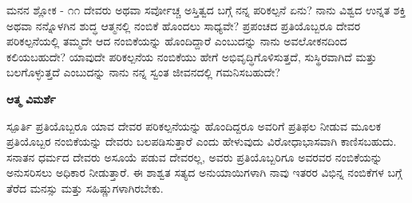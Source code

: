 \begin{mananam}{\mananamfont ಮನನ ಶ್ಲೋಕ - ೧೧}
\mananamtext ದೇವರು ಅಥವಾ ಸರ್ವೋಚ್ಚ ಅಸ್ತಿತ್ವದ ಬಗ್ಗೆ ನನ್ನ ಪರಿಕಲ್ಪನೆ ಏನು? ನಾನು ವಿಶ್ವದ ಉನ್ನತ ಶಕ್ತಿ ಅಥವಾ ನನ್ನೊಳಗಿನ ಶುದ್ಧ ಆತ್ಮನಲ್ಲಿ ನಂಬಿಕೆ ಹೊಂದಲು ಸಾಧ್ಯವೇ? ಪ್ರಪಂಚದ ಪ್ರತಿಯೊಬ್ಬರೂ ದೇವರ ಪರಿಕಲ್ಪನೆಯಲ್ಲಿ ತಮ್ಮದೇ ಆದ ನಂಬಿಕೆಯನ್ನು ಹೊಂದಿದ್ದಾರೆ ಎಂಬುದನ್ನು ನಾನು ಅವಲೋಕನದಿಂದ ಕಲಿಯಬಹುದೇ? ಯಾವುದೇ ಪರಿಕಲ್ಪನೆಯ ನಂಬಿಕೆಯು ಹೇಗೆ ಅಭಿವೃದ್ಧಿಗೊಳಿಸುತ್ತದೆ, ಸುಸ್ಥಿರವಾಗಿದೆ ಮತ್ತು ಬಲಗೊಳ್ಳುತ್ತದೆ ಎಂಬುದನ್ನು ನಾನು ನನ್ನ ಸ್ವಂತ ಜೀವನದಲ್ಲಿ ಗಮನಿಸಬಹುದೇ?
\end{mananam}
\WritingHand\enspace\textbf{ಆತ್ಮ ವಿಮರ್ಶೆ}\\
\begin{inspiration}{\mananamfont ಸ್ಪೂರ್ತಿ}
\mananamtext ಪ್ರತಿಯೊಬ್ಬರೂ ಯಾವ ದೇವರ ಪರಿಕಲ್ಪನೆಯನ್ನು ಹೊಂದಿದ್ದರೂ ಅವರಿಗೆ ಪ್ರತಿಫಲ ನೀಡುವ ಮೂಲಕ ಪ್ರತಿಯೊಬ್ಬರ ನಂಬಿಕೆಯನ್ನು ದೇವರು ಬಲಪಡಿಸುತ್ತಾರೆ ಎಂದು ಹೇಳುವುದು ವಿರೋಧಾಭಾಸವಾಗಿ ಕಾಣಿಸಬಹುದು. ಸನಾತನ ಧರ್ಮದ ದೇವರು ಅಸೂಯೆ ಪಡುವ ದೇವರಲ್ಲ, ಅವರು ಪ್ರತಿಯೊಬ್ಬರಿಗೂ ಅವರವರ ನಂಬಿಕೆಯನ್ನು ಅನುಸರಿಸಲು ಅಧಿಕಾರ ನೀಡುತ್ತಾರೆ. ಈ ಶಾಶ್ವತ ಸತ್ಯದ ಅನುಯಾಯಿಗಳಾಗಿ ನಾವು ಇತರರ ವಿಭಿನ್ನ ನಂಬಿಕೆಗಳ ಬಗ್ಗೆ ತೆರೆದ ಮನಸ್ಸು ಮತ್ತು ಸಹಿಷ್ಣುಗಳಾಗಿರಬೇಕು.
\end{inspiration}
\newpage


